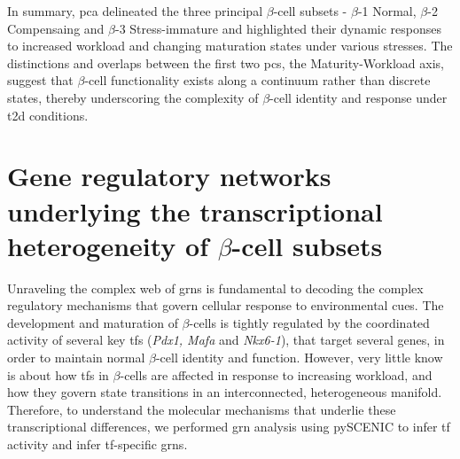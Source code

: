 
\par In summary, \gls{pca} delineated the three principal $\beta$-cell subsets - $\beta$-1 Normal, $\beta$-2 Compensaing and $\beta$-3 Stress-immature and highlighted their dynamic responses to increased workload and changing maturation states under various stresses. The distinctions and overlaps between the first two \glspl{pc}, the Maturity-Workload axis, suggest that $\beta$-cell functionality exists along a continuum rather than discrete states, thereby underscoring the complexity  of $\beta$-cell identity and response under \gls{t2d} conditions.  

\clearpage

\section[\glslink{grn}{GRNs} underlying the transcriptional heterogeneity of $\beta$-cell subsets]{Gene regulatory networks underlying the transcriptional\\heterogeneity of $\beta$-cell subsets}
\label{sec:chp3_betaGRN}
Unraveling the complex web of \glspl{grn} is fundamental to decoding the complex regulatory mechanisms that govern cellular response to environmental cues. The development and maturation of $\beta$-cells is tightly regulated by the coordinated activity of several key \glspl{tf} (\textit{Pdx1, Mafa} and \textit{Nkx6-1}), that target several genes, in order to maintain normal $\beta$-cell identity and function. However, very little know is about how \glspl{tf} in $\beta$-cells are affected in response to increasing workload, and how they govern state transitions in an interconnected, heterogeneous manifold. Therefore, to understand the molecular mechanisms that underlie these transcriptional differences, we performed \gls{grn} analysis using pySCENIC to infer \gls{tf} activity and infer \gls{tf}-specific \glspl{grn}.\\


